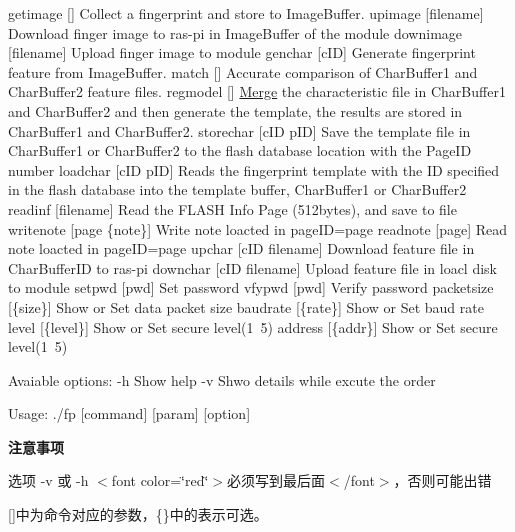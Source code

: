 \begin{DoxyCode}
  getimage  []         Collect a fingerprint and store to ImageBuffer.
  upimage   [filename] Download finger image to ras-pi in ImageBuffer of the module
  downimage [filename] Upload finger image to module
  genchar   [cID]      Generate fingerprint feature from ImageBuffer.
  match     []         Accurate comparison of CharBuffer1 and CharBuffer2
                         feature files.
  regmodel  []         \hyperlink{as608_8c_afe3350364056dcef1a4b3cafb9af7150}{Merge} the characteristic file in CharBuffer1 and
                         CharBuffer2 and then generate the \textcolor{keyword}{template}, the
                         results are stored in CharBuffer1 and CharBuffer2.
  storechar [cID pID]  Save the \textcolor{keyword}{template} file in CharBuffer1 or CharBuffer2
                         to the flash database location with the PageID number
  loadchar  [cID pID]  Reads the fingerprint \textcolor{keyword}{template} with the ID specified
                         in the flash database into the \textcolor{keyword}{template} buffer,
                         CharBuffer1 or CharBuffer2
  readinf   [filename] Read the FLASH Info Page (512bytes), and save to file
  writenote     [page \{note\}]   Write note loacted in pageID=page
  readnote      [page]          Read note loacted in pageID=page
  upchar        [cID filename]  Download feature file in CharBufferID to ras-pi
  downchar      [cID filename]  Upload feature file in loacl disk to module
  setpwd        [pwd]           Set password
  vfypwd        [pwd]           Verify password
  packetsize    [\{size\}]        Show or Set data packet size
  baudrate      [\{rate\}]        Show or Set baud rate
  level         [\{level\}]       Show or Set secure level(1~5)
  address       [\{addr\}]        Show or Set secure level(1~5)

Avaiable options:
  -h    Show help
  -v    Shwo details while excute the order

Usage:
  ./fp [command] [param] [option]
\end{DoxyCode}


{\bfseries 注意事项}


\begin{DoxyItemize}
\item 选项 {\ttfamily -\/v} 或 {\ttfamily -\/h} $<$font color=\char`\"{}red\char`\"{}$>$必须写到最后面$<$/font$>$，否则可能出错
\item {\ttfamily \mbox{[}\mbox{]}}中为命令对应的参数，{\ttfamily \{\}}中的表示可选。
\end{DoxyItemize}

